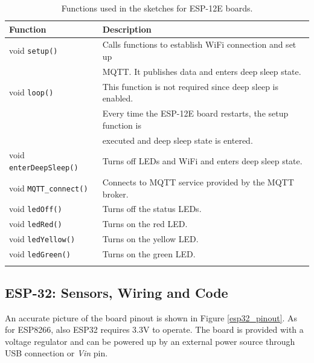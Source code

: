 \noindent\begin{minipage}{\textwidth}
	\begingroup
	\setlength{\LTleft}{-20cm plus -1fill}
	\setlength{\LTright}{\LTleft}
	\begin{longtable}{l | l}
		\hline
		\textbf{Function} & \textbf{Description} \\
		\hline
		\hline
		void \texttt{setup()} & Calls functions to establish WiFi connection and set up \\
							  & MQTT. It publishes data and enters deep sleep state. \\
		\hline
		void \texttt{loop()} & This function is not required since deep sleep is enabled. \\
						     & Every time the ESP-12E board restarts, the setup function is \\
		                     & executed and deep sleep state is entered. \\
		\hline
		void \texttt{enterDeepSleep()} & Turns off LEDs and WiFi and enters deep sleep state. \\
		\hline
		void \texttt{MQTT\_connect()} & Connects to MQTT service provided by the MQTT broker. \\
		\hline
		void \texttt{ledOff()} & Turns off the status LEDs.\\
		void \texttt{ledRed()} & Turns on the red LED.\\
		void \texttt{ledYellow()} & Turns on the yellow LED.\\
		void \texttt{ledGreen()} & Turns on the green LED.\\
		\hline
		
		\caption{Functions used in the sketches for ESP-12E boards.}
		\label{esp12_functions}
	\end{longtable}
	\endgroup
\end{minipage}

\subsection{ESP-32: Sensors, Wiring and Code}
An accurate picture of the board pinout is shown in Figure \ref{esp32_pinout}. As for ESP8266, also ESP32 requires 3.3V to operate. The board is provided with a voltage regulator and can be powered up by an external power source through USB connection or \textit{Vin} pin.

